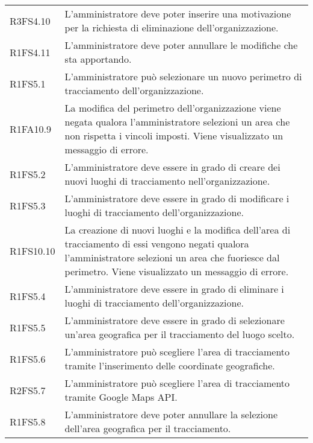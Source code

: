 {\begin{longtable}{ >{\centering}p{} >{}p{}}
R3FS4.10 & L'amministratore deve poter inserire una motivazione per la richiesta di eliminazione dell'organizzazione. \\

R1FS4.11 & L'amministratore deve poter annullare le modifiche che sta apportando. \\




R1FS5.1 & L'amministratore può selezionare un nuovo perimetro di tracciamento dell'organizzazione.\\

R1FA10.9 & La modifica del perimetro dell'organizzazione viene negata qualora l'amministratore selezioni un area che non rispetta i vincoli imposti. Viene visualizzato un messaggio di errore. \\

R1FS5.2 & L'amministratore deve essere in grado di creare dei nuovi luoghi di tracciamento nell'organizzazione. \\

R1FS5.3 & L'amministratore deve essere in grado di modificare i luoghi di tracciamento dell'organizzazione. \\

R1FS10.10 & La creazione di nuovi luoghi e la modifica dell'area di tracciamento di essi vengono negati qualora l'amministratore selezioni un area che fuoriesce dal perimetro. Viene visualizzato un messaggio di errore. \\

R1FS5.4 & L'amministratore deve essere in grado di eliminare i luoghi di tracciamento dell'organizzazione. \\

R1FS5.5 & L'amministratore deve essere in grado di selezionare un'area geografica per il tracciamento del luogo scelto. \\

R1FS5.6 &  L'amministratore può scegliere l'area di tracciamento tramite l'inserimento delle coordinate geografiche. \\

R2FS5.7 & L'amministratore può scegliere l'area di tracciamento tramite Google Maps API.\\

R1FS5.8 & L'amministratore deve poter annullare la selezione dell'area geografica per il tracciamento.\\


\end{longtable}}
